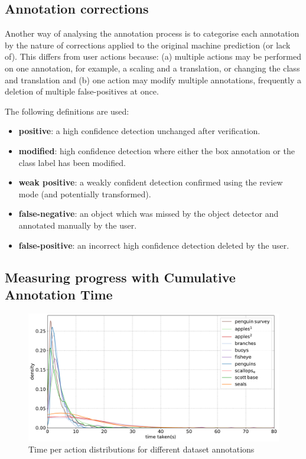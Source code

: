 \subsection{Annotation corrections}
\label{sec:corrections}

Another way of analysing the annotation process is to categorise each annotation by the nature of corrections applied to the original machine prediction (or lack of). This differs from user actions because: (a) multiple actions may be performed on one annotation, for example, a scaling and a translation, or changing the class and translation and (b) one action may modify multiple annotations, frequently a deletion of multiple false-positives at once.

The following definitions are used:

\begin{itemize}
    \item {\bf positive}: a high confidence detection unchanged after verification.
    \item {\bf modified}: high confidence detection where either the box annotation or the class label has been modified.
    \item {\bf weak positive}: a weakly confident detection confirmed using the review mode (and potentially transformed).    
    \item {\bf false-negative}: an object which was missed by the object detector and annotated manually by the user.    
    \item {\bf false-positive}: an incorrect high confidence detection deleted by the user.
\end{itemize}

\subsection{Measuring progress with Cumulative Annotation Time}
\label{sec:ann_time}

\begin{figure}[ht!] 
\centering
  \includegraphics[width=1.0\linewidth]{charts/summaries/time_density.pdf}
  \caption{Time per action distributions for different dataset annotations}
  \label{fig:annotation_time_density}
\end{figure}

